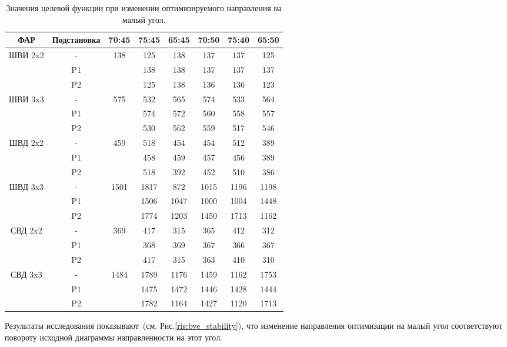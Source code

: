 \begin{table}[!h]
\centering
\begin{tabular}{|c|c|c|c|c|c|c|c|}
    \hline
    \textbf{ФАР} & \textbf{Подстановка} & \textbf{70:45} & \textbf{75:45} & \textbf{65:45} & \textbf{70:50} & \textbf{75:40} & \textbf{65:50}\\
    \hline
    \multirow{3}{*}{ШВИ 2x2} & - & \multirow{3}{*}{138} & 125 & 138 & 137 & 137 & 125\\
    & P1 &  & 138 & 138 & 137 & 137 & 137\\
    & P2 &  & 125 & 138 & 136 & 136 & 123\\
    \hline
    \multirow{3}{*}{ШВИ 3x3} & - & \multirow{3}{*}{575} & 532 & 565 & 574 & 533 & 564\\
    & P1 &  & 574 & 572 & 560 & 558 & 557\\
    & P2 &  & 530 & 562 & 559 & 517 & 546\\
    \hline
    \multirow{3}{*}{ШВД 2x2} & - & \multirow{3}{*}{459} & 518 & 454 & 454 & 512 & 389\\
    & P1 &  & 458 & 459 & 457 & 456 & 389\\
    & P2 &  & 518 & 392 & 452 & 510 & 386\\
    \hline
    \multirow{3}{*}{ШВД 3x3} & - & \multirow{3}{*}{1501} & 1817 & 872 & 1015 & 1196 & 1198\\
    & P1 &  & 1506 & 1047 & 1000 & 1004 & 1448\\
    & P2 &  & 1774 & 1203 & 1450 & 1713 & 1162\\
    \hline
    \multirow{3}{*}{СВД 2x2} & - & \multirow{3}{*}{369} & 417 & 315 & 365 & 412 & 312\\
    & P1 &  & 368 & 369 & 367 & 366 & 367\\
    & P2 &  & 417 & 315 & 363 & 410 & 310\\
    \hline
    \multirow{3}{*}{СВД 3x3} & - & \multirow{3}{*}{1484} & 1789 & 1176 & 1459 & 1162 & 1753\\
    & P1 &  & 1475 & 1472 & 1446 & 1428 & 1444\\
    & P2 &  & 1782 & 1164 & 1427 & 1120 & 1713\\
    \hline
\end{tabular}
    \caption{Значения целевой функции при изменении оптимизируемого направления на малый угол.}
    \label{tab:stability}
\end{table}

Результаты исследования показывают~(см. Рис.\ref{ris:bve_stability}), что изменение направления оптимизации на малый угол соответствуют повороту исходной диаграммы направленности на этот угол.

